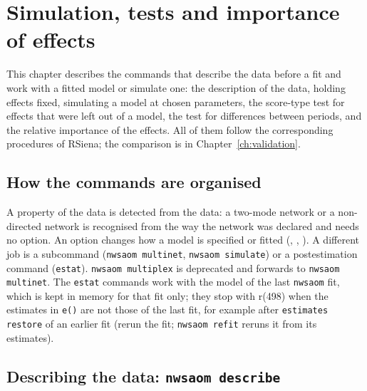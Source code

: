 \chapter{Simulation, tests and importance of effects}\label{ch:tools}

This chapter describes the commands that describe the data before a fit and work with a fitted model or simulate one: the description of the data, holding effects fixed, simulating a model at chosen parameters, the score-type test for effects that were left out of a model, the test for differences between periods, and the relative importance of the effects. All of them follow the corresponding procedures of RSiena; the comparison is in Chapter~\ref{ch:validation}.

\section{How the commands are organised}

A property of the data is detected from the data: a two-mode network or a non-directed network is recognised from the way the network was declared and needs no option. An option changes how a model is specified or fitted (, , ). A different job is a subcommand (\texttt{nwsaom multinet}, \texttt{nwsaom simulate}) or a postestimation command (\texttt{estat}). \texttt{nwsaom multiplex} is deprecated and forwards to \texttt{nwsaom multinet}. The \texttt{estat} commands work with the model of the last \texttt{nwsaom} fit, which is kept in memory for that fit only; they stop with r(498) when the estimates in \texttt{e()} are not those of the last fit, for example after \texttt{estimates restore} of an earlier fit (rerun the fit; \texttt{nwsaom refit} reruns it from its estimates).

\section{Describing the data: \texttt{nwsaom describe}}\label{sec:describe}

